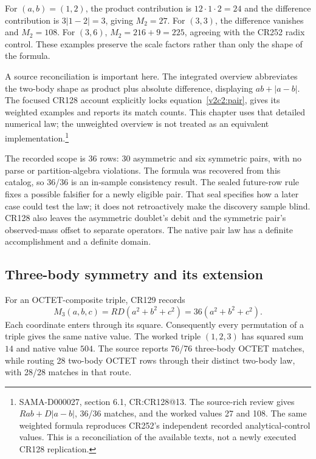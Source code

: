 For $(a,b)=(1,2)$, the product contribution is $12\cdot1\cdot2=24$ and the difference contribution is $3|1-2|=3$, giving $M_2=27$. For $(3,3)$, the difference vanishes and $M_2=108$. For $(3,6)$, $M_2=216+9=225$, agreeing with the CR252 radix control. These examples preserve the scale factors rather than only the shape of the formula.

A source reconciliation is important here. The integrated overview abbreviates the two-body shape as product plus absolute difference, displaying $ab+|a-b|$. The focused CR128 account explicitly locks equation~\eqref{v2c2:pair}, gives its weighted examples and reports its match counts. This chapter uses that detailed numerical law; the unweighted overview is not treated as an equivalent implementation.\footnote{SAMA-D000027, section 6.1, CR:CR128@13. The source-rich review gives $Rab+D|a-b|$, 36/36 matches, and the worked values 27 and 108. The same weighted formula reproduces CR252's independent recorded analytical-control values. This is a reconciliation of the available texts, not a newly executed CR128 replication.}

The recorded scope is 36 rows: 30 asymmetric and six symmetric pairs, with no parse or partition-algebra violations. The formula was recovered from this catalog, so 36/36 is an in-sample consistency result. The sealed future-row rule fixes a possible falsifier for a newly eligible pair. That seal specifies how a later case could test the law; it does not retroactively make the discovery sample blind. CR128 also leaves the asymmetric doublet's debit and the symmetric pair's observed-mass offset to separate operators. The native pair law has a definite accomplishment and a definite domain.

\subsection{Three-body symmetry and its extension}

For an OCTET-composite triple, CR129 records
\begin{equation}
M_3(a,b,c)=RD(a^2+b^2+c^2)=36(a^2+b^2+c^2).
\label{v2c2:triple}
\end{equation}
Each coordinate enters through its square. Consequently every permutation of a triple gives the same native value. The worked triple $(1,2,3)$ has squared sum $14$ and native value $504$. The source reports 76/76 three-body OCTET matches, while routing 28 two-body OCTET rows through their distinct two-body law, with 28/28 matches in that route.

